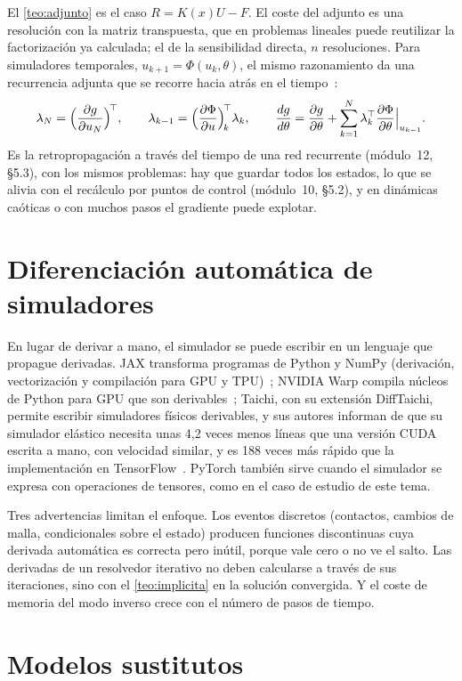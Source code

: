 El \cref{teo:adjunto} es el caso $R=K(x)U-F$. El coste del adjunto es una resolución con la matriz transpuesta, que en problemas lineales puede reutilizar la factorización ya calculada; el de la sensibilidad directa, $n$ resoluciones. Para simuladores temporales, $u_{k+1}=\Phi(u_k,\theta)$, el mismo razonamiento da una recurrencia adjunta que se recorre hacia atrás en el tiempo~\cite{johnson}:
\[
\lambda_N=\Bigl(\frac{\partial g}{\partial u_N}\Bigr)^{\!\top},\qquad \lambda_{k-1}=\Bigl(\frac{\partial\Phi}{\partial u}\Bigr)^{\!\top}_{\!k}\lambda_k,\qquad \frac{dg}{d\theta}=\frac{\partial g}{\partial\theta}+\sum_{k=1}^N\lambda_k^\top\frac{\partial\Phi}{\partial\theta}\Big|_{u_{k-1}} .
\]
Es la retropropagación a través del tiempo de una red recurrente (módulo~12, §5.3), con los mismos problemas: hay que guardar todos los estados, lo que se alivia con el recálculo por puntos de control (módulo~10, §5.2), y en dinámicas caóticas o con muchos pasos el gradiente puede explotar.

\section{Diferenciación automática de simuladores}

En lugar de derivar a mano, el simulador se puede escribir en un lenguaje que propague derivadas. JAX transforma programas de Python y NumPy (derivación, vectorización y compilación para GPU y TPU)~\cite{jax}; NVIDIA Warp compila núcleos de Python para GPU que son derivables~\cite{warp}; Taichi, con su extensión DiffTaichi, permite escribir simuladores físicos derivables, y sus autores informan de que su simulador elástico necesita unas 4,2 veces menos líneas que una versión CUDA escrita a mano, con velocidad similar, y es 188 veces más rápido que la implementación en TensorFlow~\cite{difftaichi}. PyTorch también sirve cuando el simulador se expresa con operaciones de tensores, como en el caso de estudio de este tema.

Tres advertencias limitan el enfoque. Los eventos discretos (contactos, cambios de malla, condicionales sobre el estado) producen funciones discontinuas cuya derivada automática es correcta pero inútil, porque vale cero o no ve el salto. Las derivadas de un resolvedor iterativo no deben calcularse a través de sus iteraciones, sino con el \cref{teo:implicita} en la solución convergida. Y el coste de memoria del modo inverso crece con el número de pasos de tiempo.

\section{Modelos sustitutos}

